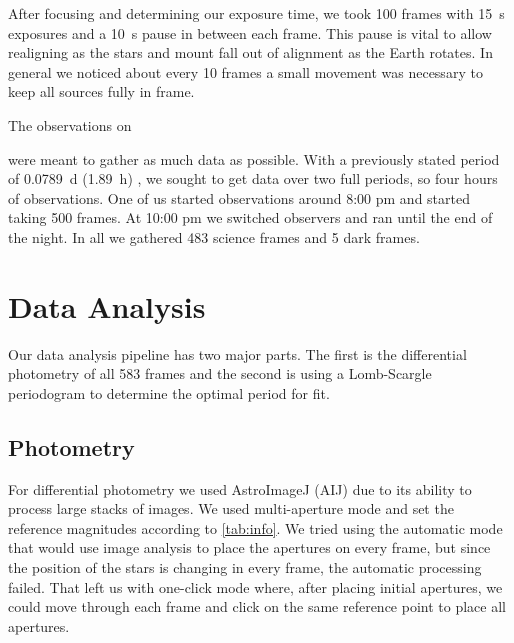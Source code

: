 \documentclass[%
aip,
jmp,
reprint,
floatfix,
nofootinbib
]{revtex4-1}
\begin{document}
	After focusing and determining our exposure time, we took 100 frames with \SI{15}{\second} exposures and a \SI{10}{\second} pause in between each frame. This pause is vital to allow realigning as the stars and mount fall out of alignment as the Earth rotates. In general we noticed about every 10 frames a small movement was necessary to keep all sources fully in frame.
	
	The observations on \date{18 October 2017} were meant to gather as much data as possible. With a previously stated period of \SI{.0789}{\day} (\SI{1.89}{\hour}) \citep{1971GCVS3.C......0K}, we sought to get data over two full periods, so four hours of observations. One of us started observations around 8:00 pm and started taking 500 frames. At 10:00 pm we switched observers and ran until the end of the night. In all we gathered 483 science frames and 5 dark frames.
	
	
	

	\section{Data Analysis}
	
	Our data analysis pipeline has two major parts. The first is the differential photometry of all 583 frames and the second is using a Lomb-Scargle periodogram to determine the optimal period for fit. 
	
	\subsection{Photometry}
	
	For differential photometry we used AstroImageJ (AIJ) due to its ability to process large stacks of images. We used multi-aperture mode and set the reference magnitudes according to \autoref{tab:info}. We tried using the automatic mode that would use image analysis to place the apertures on every frame, but since the position of the stars is changing in every frame, the automatic processing failed. That left us with one-click mode where, after placing initial apertures, we could move through each frame and click on the same reference point to place all apertures. 
	
\end{document}
